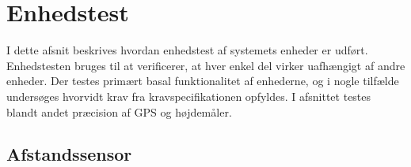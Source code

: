 \chapter{Enhedstest}
I dette afsnit beskrives hvordan enhedstest af systemets enheder er udført. Enhedstesten bruges til at verificerer, at hver enkel del virker uafhængigt af andre enheder. 
Der testes primært basal funktionalitet af enhederne, og i nogle tilfælde undersøges hvorvidt krav fra kravspecifikationen opfyldes. I afsnittet testes blandt andet præcision af GPS og højdemåler.

\section{Afstandssensor}



\newpage


\newpage 

